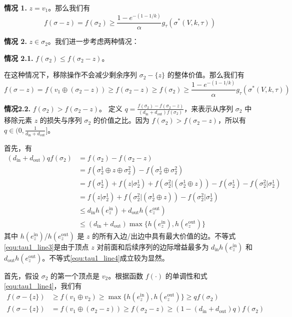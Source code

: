 \textbf{情况 1.} $z=v_1$。那么我们有
\begin{equation}
f(\sigma -z ) = f(\sigma_2) \ge \frac{1-e^{-(1-1/k)}}{\alpha} g_\tau(\sigma^*(V,k,\tau))
\end{equation}

\textbf{情况 2.} $z\in \sigma_2$。我们进一步考虑两种情况：

\textbf{情况 2.1.} $f(\sigma_2) \le f(\sigma_2-z)$。

在这种情况下，移除操作不会减少剩余序列 $\sigma_2-\{z\}$ 的整体价值。那么我们有
\begin{equation}
    f(\sigma-z)  =f(v_1 \oplus (\sigma_2-z)) \ge f(\sigma_2-z)
     \ge f(\sigma_2) \ge \frac{1-e^{-(1-1/k)}}{\alpha} g_\tau(\sigma^*(V,k,\tau))
\end{equation}

\textbf{情况2.2.} $f(\sigma_2) > f(\sigma_2-z)$。
定义 $q= \frac{f(\sigma_2)-f(\sigma_2-z)}{(d_{\text{in}}+d_{\text{out}})f(\sigma_2)}$，来表示从序列 $\sigma_2$ 中移除元素 $z$ 的损失与序列 $\sigma_2$ 的价值之比。因为 $f(\sigma_2) > f(\sigma_2-z)$，所以有 $q\in (0,\frac{1}{d_{\text{in}}+d_{\text{out}}}]$。

首先，有
\begin{align}
    (d_{\text{in}} +  d_{\text{out}}) q f(\sigma_2)&= f(\sigma_2) - f(\sigma_2-z) \\
    & = f(\sigma_2^1 \oplus z \oplus \sigma_2^2) - f(\sigma_2^1 \oplus \sigma_2^2) \\
    & = f(\sigma_2^1) + f(z|\sigma_2^1)+f(\sigma_2^2| (\sigma_2^1\oplus z)) - f(\sigma_2^1) -f(\sigma_2^2|\sigma_2^1) \\
    & = f(z|\sigma_2^1)+f(\sigma_2^2| (\sigma_2^1\oplus z)) - f(\sigma_2^2|\sigma_2^1) \\
    & \le d_{\text{in}} h(e_z^{\text{in}}) + d_{\text{out}} h(e_z^{\text{out}}) \label{equ:tau1_line3}\\
    & \le (d_{\text{in}} + d_{\text{out}}) \max \{h(e_z^{\text{in}}),h(e_z^{\text{out}})\} \label{equ:tau1_line4}
\end{align}
\noindent 其中 $h(e_z^{\text{in}})$/$h(e_z^{\text{out}})$ 是 $z$ 的所有入边/出边中具有最大价值的边。不等式\ref{equ:tau1_line3}是由于顶点 $z$ 对前面和后续序列的边际增益最多为 $d_{\text{in}} h(e_z^{\text{in}})$ 和 $d_{\text{out}} h(e_z^{\text{out}})$。不等式\ref{equ:tau1_line4}成立较为显然。

首先，假设 $\sigma_2$ 的第一个顶点是 $v_2$。根据函数 $f(\cdot)$ 的单调性和式\ref{equ:tau1_line4}，我们有
\begin{align}
    f(\sigma-\{z\}) & \ge f(v_1 \oplus v_2) \ge \max \{h(e_z^{\text{in}}),h(e_z^{\text{out}})\} \ge q f(\sigma_2) \\
    f(\sigma-\{z\}) & = f(v_1 \oplus (\sigma_2-z)) \ge f(\sigma_2 -z) \ge (1-(d_{\text{in}} + d_{\text{out}})q) f(\sigma_2)
\end{align}

